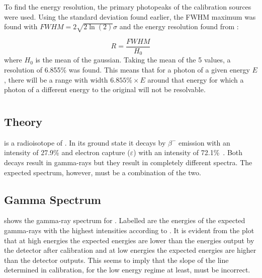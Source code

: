 \documentclass[11pt]{article}
\numberwithin{equation}{section}
\numberwithin{figure}{section}
\numberwithin{table}{section}
\begin{document}
To find the energy resolution, the primary photopeaks of the calibration sources were used. Using the standard deviation found earlier, the FWHM maximum was found with $FWHM=2\sqrt{2\ln(2)}\sigma$ and the energy resolution found from \cite[Fig. 4.5]{Knoll}:

\begin{equation}
    R=\frac{FWHM}{H_0}
    \label{eqn:EnergyResolution}
\end{equation}
where $H_0$ is the mean of the gaussian. Taking the mean of the 5 values, a resolution of 6.855\% was found. This means that for a photon of a given energy $E$, there will be a range with width $6.855\%\times E$ around that energy for which a photon of a different energy to the original will not be resolvable. 

\section{}\label{sec:Eu}

\subsection{ Theory}
 is a radioisotope of . In its ground state it decays by $\beta^-$ emission with an intensity of 27.9\% and electron capture ($\varepsilon$) with an intensity of 72.1\%~\cite{nudat}. Both decays result in gamma-rays but they result in completely different spectra. The expected spectrum, however, must be a combination of the two. 

\subsection{ Gamma Spectrum}
 shows the gamma-ray spectrum for . Labelled are the energies of the expected gamma-rays with the highest intensities according to \cite{nudat}. It is evident from the plot that at high energies the expected energies are lower than the energies output by the detector after calibration and at low energies the expected energies are higher than the detector outputs. This seems to imply that the slope of the line determined in calibration, for the low energy regime at least, must be incorrect. 
\end{document}
